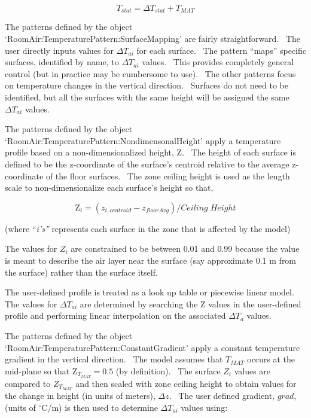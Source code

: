 \begin{equation}
{T_{stat}} = \Delta {T_{stat}} + {T_{MAT}}
\end{equation}

The patterns defined by the object `RoomAir:TemperaturePattern:SurfaceMapping' are fairly straightforward.~ The user directly inputs values for \(\Delta {T_{ai}}\) for each surface.~ The pattern ``maps'' specific surfaces, identified by name, to \(\Delta {T_{ai}}\) values.~ This provides completely general control (but in practice may be cumbersome to use).~ The other patterns focus on temperature changes in the vertical direction.~ Surfaces do not need to be identified, but all the surfaces with the same height will be assigned the same \(\Delta {T_{ai}}\) values.

The patterns defined by the object `RoomAir:TemperaturePattern:NondimensonalHeight' apply a temperature profile based on a non-dimensionalized height, \(\mathrm{Z}\).~ The height of each surface is defined to be the z-coordinate of the surface's centroid relative to the average z-coordinate of the floor surfaces.~ The zone ceiling height is used as the length scale to non-dimensionalize each surface's height so that,

\begin{equation}
{\mathrm{Z}_i} = ({z_{i,centroid}} - {z_{floorAvg}})/Ceiling\;Height
\end{equation}

(where ``\emph{i's''} represents each surface in the zone that is affected by the model)

The values for \({Z_i}\) are constrained to be between 0.01 and 0.99 because the value is meant to describe the air layer near the surface (say approximate 0.1 m from the surface) rather than the surface itself.

The user-defined profile is treated as a look up table or piecewise linear model.~ The values for \(\Delta {T_{ai}}\) are determined by searching the \(\mathrm{Z}\) values in the user-defined profile and performing linear interpolation on the associated \(\Delta {T_a}\) values.

The patterns defined by the object `RoomAir:TemperaturePattern:ConstantGradient' apply a constant temperature gradient in the vertical direction.~ The model assumes that \({T_{MAT}}\) occurs at the mid-plane so that \({\mathrm{Z}_{{T_{MAT}}}} = 0.5\) (by definition).~ The surface \({Z_i}\) values are compared to \({Z_{{T_{MAT}}}}\) and then scaled with zone ceiling height to obtain values for the change in height (in units of meters), \(\Delta z\).~ The user defined gradient, \(grad\), (units of \(^{\circ}\)C/m) is then used to determine \(\Delta {T_{ai}}\) values using:

